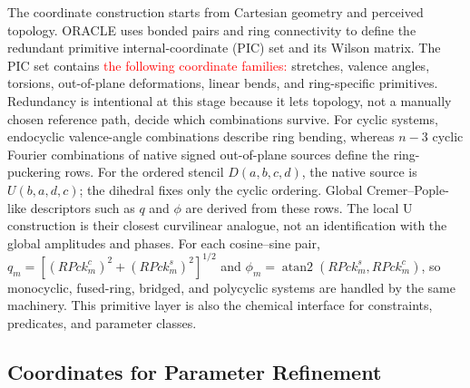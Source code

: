 \documentclass[aip,jcp,reprint,longbibliography,floatfix]{revtex4-2}
\newcommand{\rev}[1]{\textcolor{red}{#1}}
\begin{document}
The coordinate construction starts from Cartesian geometry and perceived
topology. ORACLE uses bonded pairs and ring connectivity to define the
redundant primitive internal-coordinate (PIC) set and its Wilson matrix. The
PIC set contains \rev{the following coordinate families:} stretches, valence
angles, torsions, out-of-plane deformations,
linear bends, and ring-specific primitives. Redundancy is intentional at this
stage because it lets topology, not a manually chosen reference path, decide
which combinations survive. For cyclic systems, endocyclic valence-angle
combinations describe ring bending, whereas \(n-3\) cyclic Fourier
combinations of native signed out-of-plane sources define the ring-puckering
rows. For the ordered stencil \(D(a,b,c,d)\), the native source is
\(U(b,a,d,c)\); the dihedral fixes only the cyclic ordering. Global
Cremer--Pople-like descriptors such as $q$ and $\phi$ are derived from these
rows. The local U construction is their closest curvilinear analogue, not an
identification with the global amplitudes and phases.  For each cosine--sine
pair, \(q_m=[(RPck_m^c)^2+(RPck_m^s)^2]^{1/2}\) and
\(\phi_m=\operatorname{atan2}(RPck_m^s,RPck_m^c)\), so
monocyclic, fused-ring, bridged, and polycyclic systems are handled by the
same machinery.\cite{CremerPople1975} This
primitive layer is also the chemical interface for constraints, predicates,
and parameter classes.


\subsection{Coordinates for Parameter Refinement}
\end{document}
